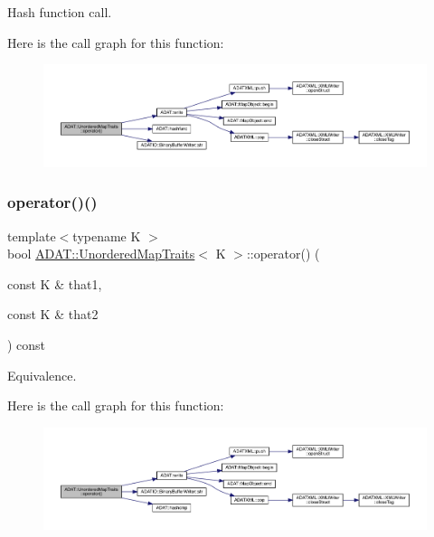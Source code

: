 Hash function call. 

Here is the call graph for this function\+:
\nopagebreak
\begin{figure}[H]
\begin{center}
\leavevmode
\includegraphics[width=350pt]{dd/d81/structADAT_1_1UnorderedMapTraits_ab9d8c80fb0f561fdadad5be6263d3f94_cgraph}
\end{center}
\end{figure}
\mbox{\label{structADAT_1_1UnorderedMapTraits_a14c1daf5e4530fc4c749ec681103e7a2}} 
\subsubsection{\texorpdfstring{operator()()}{operator()()}\hspace{0.1cm}{\footnotesize\ttfamily [4/6]}}
{\footnotesize\ttfamily template$<$typename K $>$ \\
bool \mbox{\hyperlink{structADAT_1_1UnorderedMapTraits}{A\+D\+A\+T\+::\+Unordered\+Map\+Traits}}$<$ K $>$\+::operator() (\begin{DoxyParamCaption}\item[{const K \&}]{that1,  }\item[{const K \&}]{that2 }\end{DoxyParamCaption}) const\hspace{0.3cm}{\ttfamily [inline]}}



Equivalence. 

Here is the call graph for this function\+:\nopagebreak
\begin{figure}[H]
\begin{center}
\leavevmode
\includegraphics[width=350pt]{dd/d81/structADAT_1_1UnorderedMapTraits_a14c1daf5e4530fc4c749ec681103e7a2_cgraph}
\end{center}
\end{figure}
\mbox{\label{structADAT_1_1UnorderedMapTraits_a14c1daf5e4530fc4c749ec681103e7a2}} 
